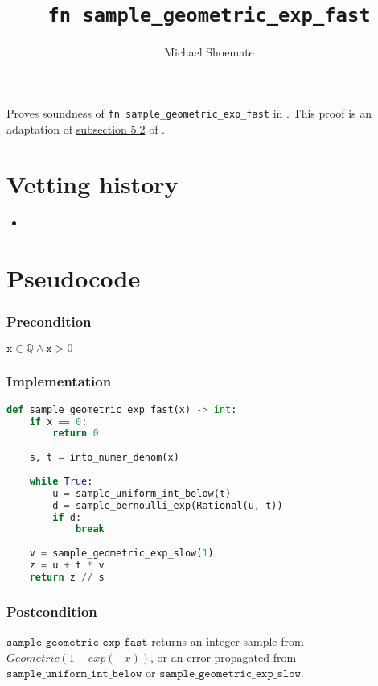 \documentclass{article}
\title{\texttt{fn sample\_geometric\_exp\_fast}}
\author{Michael Shoemate}
\begin{document}
\maketitle

\contrib
Proves soundness of \texttt{fn sample\_geometric\_exp\_fast} in .
This proof is an adaptation of \href{https://arxiv.org/pdf/2004.00010.pdf#subsection.5.2}{subsection 5.2} of \cite{CKS20}.

\section{Vetting history}
\begin{itemize}
    \item {}
\end{itemize}

\section{Pseudocode}
\subsubsection*{Precondition}
$\texttt{x} \in \mathbb{Q} \land \texttt{x} > 0$

\subsubsection*{Implementation}        
\begin{lstlisting}[language=Python]
def sample_geometric_exp_fast(x) -> int:
    if x == 0:
        return 0
    
    s, t = into_numer_denom(x)
    
    while True:
        u = sample_uniform_int_below(t)
        d = sample_bernoulli_exp(Rational(u, t))
        if d:
            break
        
    v = sample_geometric_exp_slow(1)
    z = u + t * v
    return z // s
\end{lstlisting}

\subsubsection*{Postcondition}
$\texttt{sample\_geometric\_exp\_fast}$ returns an integer sample from $Geometric(1 - exp(-x))$, or an error propagated from $\texttt{sample\_uniform\_int\_below}$ or $\texttt{sample\_geometric\_exp\_slow}$.
\end{document}
